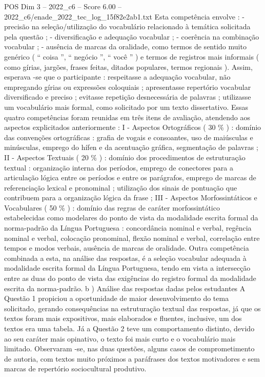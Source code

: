 \begin{textsample}{POS Dim 3 – 2022\_c6 – Score 6.00 – 2022\_c6/enade\_2022\_tec\_log\_15f82e2ab1.txt}
Esta competência envolve : - precisão na seleção/utilização do vocabulário relacionado à temática solicitada pela questão ; - diversificação e adequação vocabular ; - coerência na combinação vocabular ; - ausência de marcas da oralidade, como termos de sentido muito genérico ( “ coisa ”, “ negócio ”, “ você ” ) e termos de registros mais informais ( como gírias, jargões, frases feitas, ditados populares, termos regionais ).
Assim, esperava -se que o participante : respeitasse a adequação vocabular, não empregando gírias ou expressões coloquiais ; apresentasse repertório vocabular diversificado e preciso ; evitasse repetição desnecessária de palavras ; utilizasse um vocabulário mais formal, como solicitado por um texto dissertativo.
Essas quatro competências foram reunidas em três itens de avaliação, atendendo aos aspectos explicitados anteriormente : I - Aspectos Ortográficos ( 30 \% ) : domínio das convenções ortográficas : grafia de vogais e consoantes, uso de maiúsculas e minúsculas, emprego do hífen e da acentuação gráfica, segmentação de palavras ; II - Aspectos Textuais ( 20 \% ) : domínio dos procedimentos de estruturação textual : organização interna dos períodos, emprego de conectores para a articulação lógica entre os períodos e entre os parágrafos, emprego de marcas de referenciação lexical e pronominal ; utilização dos sinais de pontuação que contribuem para a organização lógica da frase ; III - Aspectos Morfossintáticos e Vocabulares ( 50 \% ) : domínio das regras de caráter morfossintático estabelecidas como modelares do ponto de vista da modalidade escrita formal da norma-padrão da Língua Portuguesa : concordância nominal e verbal, regência nominal e verbal, colocação pronominal, flexão nominal e verbal, correlação entre tempos e modos verbais, ausência de marcas de oralidade.
Outra competência combinada a esta, na análise das respostas, é a seleção vocabular adequada à modalidade escrita formal da Língua Portuguesa, tendo em vista a intersecção entre as duas do ponto de vista das exigências do registro formal da modalidade escrita da norma-padrão. b ) Análise das respostas dadas pelos estudantes A Questão 1 propiciou a oportunidade de maior desenvolvimento do tema solicitado, gerando consequências na estruturação textual das respostas, já que os textos foram mais expositivos, mais elaborados e fluentes, inclusive, um dos textos era uma tabela.
Já a Questão 2 teve um comportamento distinto, devido ao seu caráter mais opinativo, o texto foi mais curto e o vocabulário mais limitado.
Observaram -se, nas duas questões, alguns casos de comprometimento de autoria, com textos muito próximos a paráfrases dos textos motivadores e sem marcas de repertório sociocultural produtivo.

\end{textsample}
